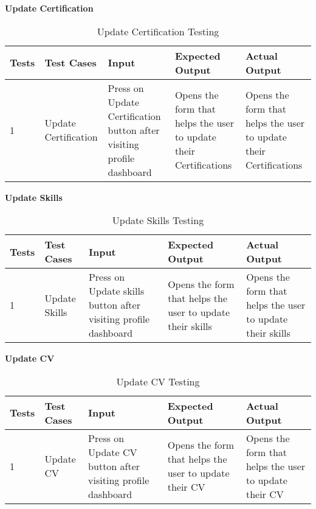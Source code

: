\textbf{Update Certification}\\
\begin{table}[H]
    \caption{Update Certification Testing}
        \label{}
    \begin{tabular}{|p{0.3in}|p{1.2in}|p{1.2in}|p{1.2in}|p{1in}|}
        \hline
        Tests & Test Cases & Input &Expected Output & Actual Output \\
        \hline
            1 &Update Certification & Press on Update Certification button after visiting profile dashboard &Opens the form that helps the user to update their Certifications  &Opens the form that helps the user to update their Certifications  \\
            \hline
\end{tabular}
\end{table}

\newpage
\textbf{Update Skills}\\
\begin{table}[H]
    \caption{Update Skills Testing}
        \label{}
    \begin{tabular}{|p{0.3in}|p{1.2in}|p{1.2in}|p{1.2in}|p{1in}|}
        \hline
        Tests & Test Cases & Input &Expected Output & Actual Output \\
        \hline
            1 &Update Skills & Press on Update skills button after visiting profile dashboard &Opens the form that helps the user to update their skills  &Opens the form that helps the user to update their skills  \\
            \hline
\end{tabular}
\end{table}

\textbf{Update CV}\\
\begin{table}[H]
    \caption{Update CV Testing}
        \label{}
    \begin{tabular}{|p{0.3in}|p{1.2in}|p{1.2in}|p{1.2in}|p{1in}|}
        \hline
        Tests & Test Cases & Input &Expected Output & Actual Output \\
        \hline
            1 &Update CV & Press on Update CV button after visiting profile dashboard &Opens the form that helps the user to update their CV  &Opens the form that helps the user to update their CV  \\
            \hline
\end{tabular}
\end{table}

